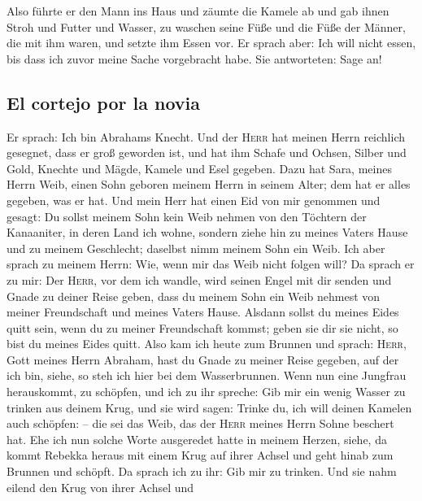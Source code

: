  Also führte er den Mann ins Haus und zäumte die Kamele
ab und gab ihnen Stroh und Futter und Wasser, zu waschen seine Füße und
die Füße der Männer, die mit ihm waren,  und setzte ihm
Essen vor. Er sprach aber: Ich will nicht essen, bis dass ich zuvor
meine Sache vorgebracht habe. Sie antworteten: Sage an!

\hypertarget{el-cortejo-por-la-novia}{%
\subsection{El cortejo por la novia}\label{el-cortejo-por-la-novia}}

 Er sprach: Ich bin Abrahams Knecht.  Und
der \textsc{Herr} hat meinen Herrn reichlich gesegnet, dass er groß
geworden ist, und hat ihm Schafe und Ochsen, Silber und Gold, Knechte
und Mägde, Kamele und Esel gegeben.  Dazu hat Sara,
meines Herrn Weib, einen Sohn geboren meinem Herrn in seinem Alter; dem
hat er alles gegeben, was er hat.  Und mein Herr hat
einen Eid von mir genommen und gesagt: Du sollst meinem Sohn kein Weib
nehmen von den Töchtern der Kanaaniter, in deren Land ich wohne,
 sondern ziehe hin zu meines Vaters Hause und zu meinem
Geschlecht; daselbst nimm meinem Sohn ein Weib.  Ich aber
sprach zu meinem Herrn: Wie, wenn mir das Weib nicht folgen will?
 Da sprach er zu mir: Der \textsc{Herr}, vor dem ich
wandle, wird seinen Engel mit dir senden und Gnade zu deiner Reise
geben, dass du meinem Sohn ein Weib nehmest von meiner Freundschaft und
meines Vaters Hause.  Alsdann sollst du meines Eides
quitt sein, wenn du zu meiner Freundschaft kommst; geben sie dir sie
nicht, so bist du meines Eides quitt.  Also kam ich heute
zum Brunnen und sprach: \textsc{Herr}, Gott meines Herrn Abraham, hast
du Gnade zu meiner Reise gegeben, auf der ich bin, 
siehe, so steh ich hier bei dem Wasserbrunnen. Wenn nun eine Jungfrau
herauskommt, zu schöpfen, und ich zu ihr spreche: Gib mir ein wenig
Wasser zu trinken aus deinem Krug,  und sie wird sagen:
Trinke du, ich will deinen Kamelen auch schöpfen: -- die sei das Weib,
das der \textsc{Herr} meines Herrn Sohne beschert hat. 
Ehe ich nun solche Worte ausgeredet hatte in meinem Herzen, siehe, da
kommt Rebekka heraus mit einem Krug auf ihrer Achsel und geht hinab zum
Brunnen und schöpft. Da sprach ich zu ihr: Gib mir zu trinken.
 Und sie nahm eilend den Krug von ihrer Achsel und
